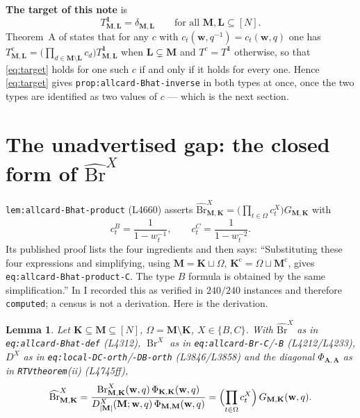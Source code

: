 \documentclass[11pt]{article}
\theoremstyle{plain}
\newtheorem{lem}[thm]{Lemma}
\theoremstyle{definition}
\theoremstyle{remark}
\newcommand{\bM}{\mathbf M}
\newcommand{\bK}{\mathbf K}
\newcommand{\bL}{\mathbf L}
\newcommand{\bA}{\mathbf A}
\newcommand{\bw}{\mathbf w}
\newcommand{\cm}{{\mathrm c}}
\newcommand{\Br}{\operatorname{Br}}
\newcommand{\Bh}{\widehat{\mathrm{Br}}}
\newcommand{\Om}{\Omega}
\begin{document}
\noindent
\textbf{The target of this note} is
\begin{equation}
T^{\mathbf 1}_{\bM,\bL}=\delta_{\bM,\bL}\qquad\text{for all }\bM,\bL\subseteq[N].
\label{eq:target}
\end{equation}
Theorem~A of \cite{ClioA} states that for any $c$ with $c_t(\bw,q^{-1})=c_t(\bw,q)$
one has $T^c_{\bM,\bL}=\bigl(\prod_{d\in\bM\setminus\bL}c_d\bigr)T^{\mathbf 1}_{\bM,\bL}$
when $\bL\subsetneq\bM$ and $T^c=T^{\mathbf 1}$ otherwise, so that
\eqref{eq:target} holds for one such $c$ if and only if it holds for every one.
Hence \eqref{eq:target} gives \texttt{prop:allcard-Bhat-inverse} in both types at
once, once the two types are identified as two values of $c$ --- which is the next
section.

\section{The unadvertised gap: the closed form of \texorpdfstring{$\Bh^X$}{Bhat}}
\label{sec:bhatprod}

\texttt{lem:allcard-Bhat-product} (L4660) asserts
$\Bh^X_{\bM,\bK}=\bigl(\prod_{t\in\Om}c^X_t\bigr)G_{\bM,\bK}$ with
\[
c^B_t=\frac1{1-w_t^{-1}},\qquad c^C_t=\frac1{1-w_t^{-2}} .
\]
Its published proof lists the four ingredients and then says: ``Substituting these
four expressions and simplifying, using $\bM=\bK\sqcup\Om$,
$\bK^\cm=\Om\sqcup\bM^\cm$, gives \texttt{eq:allcard-Bhat-product-C}. The type $B$
formula is obtained by the same simplification.'' In \cite{ClioA} I recorded this
as verified in $240/240$ instances and therefore \texttt{computed}; a census is not
a derivation. Here is the derivation.

\begin{lem}
\label{lem:bhatprod}
Let $\bK\subseteq\bM\subseteq[N]$, $\Om=\bM\setminus\bK$, $X\in\{B,C\}$. With
$\Bh^X$ as in \texttt{eq:allcard-Bhat-def} \textup{(L4312)}, $\Br^X$ as in
\texttt{eq:allcard-Br-C}/\texttt{-B} \textup{(L4212/L4233)}, $D^X$ as in
\texttt{eq:local-DC-orth}/\texttt{-DB-orth} \textup{(L3846/L3858)} and the diagonal
$\Phi_{\bA,\bA}$ as in \texttt{RTVtheorem}\textup{(ii)} \textup{(L4745ff)},
\[
\Bh^X_{\bM,\bK}
=\frac{\Br^X_{\bM,\bK}(\bw,q)\,\Phi_{\bK,\bK}(\bw,q)}
      {D^X_{|\bM|}(\bM;\bw,q)\,\Phi_{\bM,\bM}(\bw,q)}
=\Bigl(\prod_{t\in\Om}c^X_t\Bigr)\,G_{\bM,\bK}(\bw,q).
\]
\end{lem}
\end{document}
